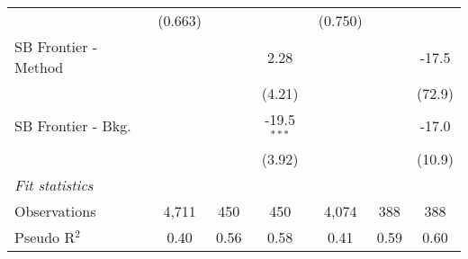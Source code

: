 \begin{tabular}{lcccccc}
                                  & (0.663)      &         &               & (0.750)      &              &   \\   
   SB Frontier - Method           &              &         & 2.28          &              &              & -17.5\\   
                                  &              &         & (4.21)        &              &              & (72.9)\\   
   SB Frontier - Bkg.             &              &         & -19.5$^{***}$ &              &              & -17.0\\   
                                  &              &         & (3.92)        &              &              & (10.9)\\   
   \midrule
   \emph{Fit statistics}\\
   Observations                   & 4,711        & 450     & 450           & 4,074        & 388          & 388\\  
   Pseudo R$^2$                   & 0.40         & 0.56    & 0.58          & 0.41         & 0.59         & 0.60\\  
   

\end{tabular}
